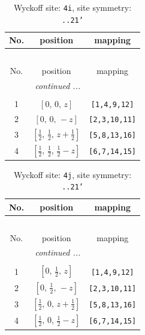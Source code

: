 \documentclass[fleqn,8pt]{jsarticle}
\begin{document}
\renewcommand{\arraystretch}{1.2}
\begin{longtable}{ccc}
\caption{Wyckoff site: {\tt 4i}, site symmetry: {\tt ..21'}}
 \\
 \hline \hline
No. & position & mapping \\ \hline \endfirsthead

\multicolumn{2}{l}{\tablename\ \thetable{}} \\
 \hline \hline
No. & position & mapping \\ \hline \endhead

 \hline \hline
\multicolumn{2}{r}{\footnotesize\it continued ...} \\ \endfoot

 \hline \hline
\multicolumn{2}{r}{} \\ \endlastfoot

1 & $\left[ 0,\, 0,\, z \right]$ & {\tt [1,4,9,12]} \\ \hline
2 & $\left[ 0,\, 0,\, - z \right]$ & {\tt [2,3,10,11]} \\ \hline
3 & $\left[ \frac{1}{2},\, \frac{1}{2},\, z + \frac{1}{2} \right]$ & {\tt [5,8,13,16]} \\ \hline
4 & $\left[ \frac{1}{2},\, \frac{1}{2},\, \frac{1}{2} - z \right]$ & {\tt [6,7,14,15]} \\
\end{longtable}
\renewcommand{\arraystretch}{1.2}
\begin{longtable}{ccc}
\caption{Wyckoff site: {\tt 4j}, site symmetry: {\tt ..21'}}
 \\
 \hline \hline
No. & position & mapping \\ \hline \endfirsthead

\multicolumn{2}{l}{\tablename\ \thetable{}} \\
 \hline \hline
No. & position & mapping \\ \hline \endhead

 \hline \hline
\multicolumn{2}{r}{\footnotesize\it continued ...} \\ \endfoot

 \hline \hline
\multicolumn{2}{r}{} \\ \endlastfoot

1 & $\left[ 0,\, \frac{1}{2},\, z \right]$ & {\tt [1,4,9,12]} \\ \hline
2 & $\left[ 0,\, \frac{1}{2},\, - z \right]$ & {\tt [2,3,10,11]} \\ \hline
3 & $\left[ \frac{1}{2},\, 0,\, z + \frac{1}{2} \right]$ & {\tt [5,8,13,16]} \\ \hline
4 & $\left[ \frac{1}{2},\, 0,\, \frac{1}{2} - z \right]$ & {\tt [6,7,14,15]} \\
\end{longtable}
\end{document}
